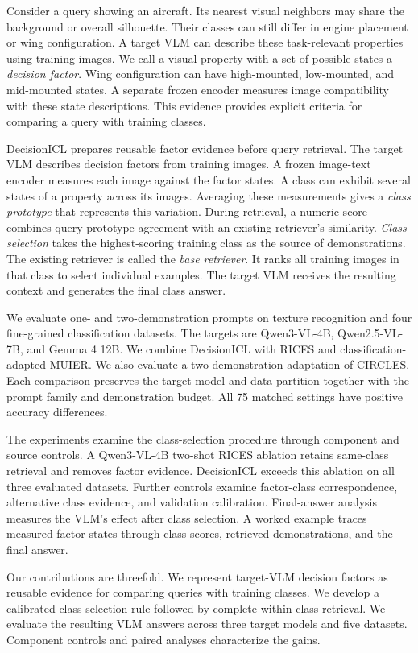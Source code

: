 \documentclass[10pt,twocolumn,letterpaper]{article}
\newcommand{\method}{DecisionICL\xspace}
\begin{document}
Consider a query showing an aircraft. Its nearest visual neighbors may share the background or overall silhouette. Their classes can still differ in engine placement or wing configuration. A target VLM can describe these task-relevant properties using training images. We call a visual property with a set of possible states a \emph{decision factor}. Wing configuration can have high-mounted, low-mounted, and mid-mounted states. A separate frozen encoder measures image compatibility with these state descriptions. This evidence provides explicit criteria for comparing a query with training classes.

\method prepares reusable factor evidence before query retrieval. The target VLM describes decision factors from training images. A frozen image-text encoder measures each image against the factor states. A class can exhibit several states of a property across its images. Averaging these measurements gives a \emph{class prototype} that represents this variation. During retrieval, a numeric score combines query-prototype agreement with an existing retriever's similarity. \emph{Class selection} takes the highest-scoring training class as the source of demonstrations. The existing retriever is called the \emph{base retriever}. It ranks all training images in that class to select individual examples. The target VLM receives the resulting context and generates the final class answer.

We evaluate one- and two-demonstration prompts on texture recognition and four fine-grained classification datasets. The targets are Qwen3-VL-4B, Qwen2.5-VL-7B, and Gemma 4 12B. We combine \method with RICES and classification-adapted MUIER. We also evaluate a two-demonstration adaptation of CIRCLES. Each comparison preserves the target model and data partition together with the prompt family and demonstration budget. All 75 matched settings have positive accuracy differences.

The experiments examine the class-selection procedure through component and source controls. A Qwen3-VL-4B two-shot RICES ablation retains same-class retrieval and removes factor evidence. \method exceeds this ablation on all three evaluated datasets. Further controls examine factor-class correspondence, alternative class evidence, and validation calibration. Final-answer analysis measures the VLM's effect after class selection. A worked example traces measured factor states through class scores, retrieved demonstrations, and the final answer.

Our contributions are threefold. We represent target-VLM decision factors as reusable evidence for comparing queries with training classes. We develop a calibrated class-selection rule followed by complete within-class retrieval. We evaluate the resulting VLM answers across three target models and five datasets. Component controls and paired analyses characterize the gains.
\end{document}
